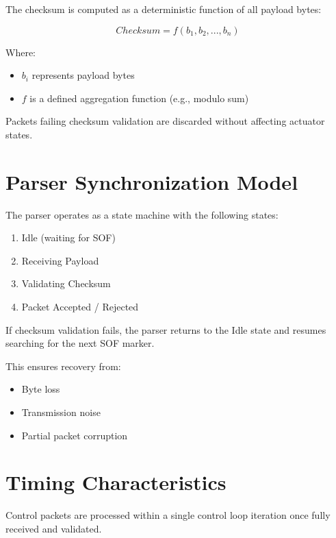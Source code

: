 The checksum is computed as a deterministic function of all payload bytes:

\[
Checksum = f(b_1, b_2, ..., b_n)
\]

Where:

\begin{itemize}
	\item $b_i$ represents payload bytes
	\item $f$ is a defined aggregation function (e.g., modulo sum)
\end{itemize}

Packets failing checksum validation are discarded without affecting actuator states.


\section{Parser Synchronization Model}

The parser operates as a state machine with the following states:

\begin{enumerate}
	\item Idle (waiting for SOF)
	\item Receiving Payload
	\item Validating Checksum
	\item Packet Accepted / Rejected
\end{enumerate}

If checksum validation fails, the parser returns to the Idle state and resumes searching for the next SOF marker.

This ensures recovery from:

\begin{itemize}
	\item Byte loss
	\item Transmission noise
	\item Partial packet corruption
\end{itemize}


\section{Timing Characteristics}

Control packets are processed within a single control loop iteration once fully received and validated.

